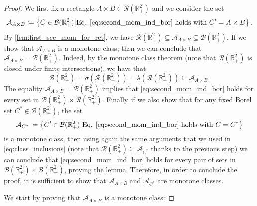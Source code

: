 \documentclass[11pt,a4paper,oneside]{article}
\theoremstyle{definition}
\theoremstyle{remark}
\def\R{\mathbb{R}}
\begin{document}
\begin{proof}
We first fix a rectangle $A\times B\in\mathcal{R}(\R_+^2)$ and we consider the set
\begin{equation}
\mathcal{A}_{A\times B}\coloneqq \left\{C\in\mathcal{B}(\R_+^2)\middle |\text{Eq. }\eqref{eq:second_mom_ind_bor} \text{ holds with } C'=A\times B \right\}.
\end{equation}
By \cref{lem:first_sec_mom_for_ret}, we have $\mathcal{R}(\R_+^2)\subseteq\mathcal{A}_{A\times B}\subseteq \mathcal{B}(\R_+^2)$.  If we show that $\mathcal{A}_{A\times B}$ is a monotone class, then we can conclude that $\mathcal{A}_{A\times B}=\mathcal{B}(\R_+^2)$. Indeed, by the monotone class theorem (note that $\mathcal{R}(\R_+^2)$ is closed under finite intersections), we have that
\begin{equation}\label{eq:class_inclusions}
\mathcal{B}(\R_+^2)= \sigma\left(\mathcal{R}(\R_+^2)\right)=\lambda\left(\mathcal{R}(\R_+^2)\right) \subseteq\mathcal{A}_{A\times B}.
\end{equation}
The equality $\mathcal{A}_{A\times B}=\mathcal{B}(\R_+^2)$ implies that \cref{eq:second_mom_ind_bor} holds for every set in $\mathcal{B}(\R_+^2)\times \mathcal{R}(\R_+^2)$. Finally, if we also show that for any fixed Borel set $C^*\in\mathcal{B}(\R_+^2)$, the set
\begin{equation}
\mathcal{A}_{C^*}\coloneqq \left\{C'\in\mathcal{B}(\R_+^2)\middle |\text{Eq. }\eqref{eq:second_mom_ind_bor} \text{ holds with } C=C^* \right\}
\end{equation}
is a monotone class, then using again the same arguments that we used in \cref{eq:class_inclusions} (note that $\mathcal{R}(\R_+^2)\subseteq\mathcal{A}_{C^*}$ thanks to the previous step) we can conclude that \cref{eq:second_mom_ind_bor} holds for every pair of sets in $\mathcal{B}(\R_+^2)\times \mathcal{B}(\R_+^2)$, proving the lemma. Therefore, in order to conclude the proof, it is sufficient to show that $\mathcal{A}_{A \times B}$ and $\mathcal{A}_{C^*}$ are monotone classes.

\medskip


We start by proving that $\mathcal{A}_{A\times B}$ is a monotone class:


\end{proof}
\end{document}
